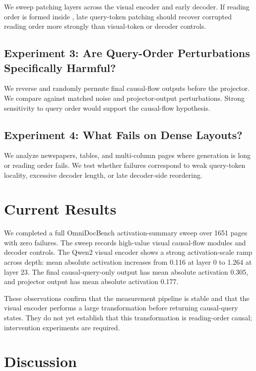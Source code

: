 \documentclass{article}
\begin{document}
We sweep patching layers across the visual encoder and early decoder. If reading order is formed inside \encodername{}, late query-token patching should recover corrupted reading order more strongly than visual-token or decoder controls.

\subsection{Experiment 3: Are Query-Order Perturbations Specifically Harmful?}

We reverse and randomly permute final causal-flow outputs before the projector. We compare against matched noise and projector-output perturbations. Strong sensitivity to query order would support the causal-flow hypothesis.

\subsection{Experiment 4: What Fails on Dense Layouts?}

We analyze newspapers, tables, and multi-column pages where generation is long or reading order fails. We test whether failures correspond to weak query-token locality, excessive decoder length, or late decoder-side reordering.

\section{Current Results}

We completed a full OmniDocBench activation-summary sweep over 1651 pages with zero failures. The sweep records high-value visual causal-flow modules and decoder controls. The Qwen2 visual encoder shows a strong activation-scale ramp across depth: mean absolute activation increases from 0.116 at layer 0 to 1.264 at layer 23. The final causal-query-only output has mean absolute activation 0.305, and projector output has mean absolute activation 0.177.

These observations confirm that the measurement pipeline is stable and that the visual encoder performs a large transformation before returning causal-query states. They do not yet establish that this transformation is reading-order causal; intervention experiments are required.

\section{Discussion}
\end{document}
